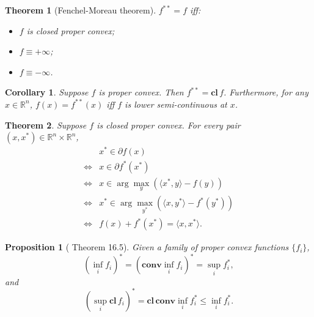 \documentclass[openany]{book}
\newtheorem{corollary}{Corollary}[chapter]
\newtheorem{proposition}{Proposition}[chapter]
\newtheorem{theorem}{Theorem}[chapter]
\theoremstyle{definition}
\theoremstyle{remark}
\begin{document}
\begin{theorem}[Fenchel-Moreau theorem]
    $f^{**}=f$ iff:
    \begin{itemize}
        \item $f$ is closed proper convex;
        \item $f\equiv+\infty$;
        \item $f\equiv-\infty$.
    \end{itemize}
\end{theorem}
\begin{corollary}\label{cor:pointBiconj}
    Suppose $f$ is proper convex. Then $f^{**}=\mathbf{cl}\,f$. Furthermore, for any $x\in \mathbb{R}^n$, $f(x)=f^{**}(x)$ iff $f$ is lower semi-continuous at $x$.
\end{corollary}
\begin{theorem}\label{convConjSubgrad}
    Suppose $f$ is closed proper convex. For every pair $(x,x^*) \in \mathbb{R}^n\times \mathbb{R}^n$,
    \begin{equation}
        \begin{array}{cl}
             & x^* \in \partial f(x) \\
            \iff & x \in \partial f^*(x^*) \\
            \iff & x \in \arg\max_{y} ( \langle x^*,y\rangle - f(y) ) \\
            \iff & x^* \in \arg\max_{y^{*}} ( \langle x,y^*\rangle - f^*(y^*) ) \\
            \iff & f(x)+f^*(x^*)=\langle x,x^*\rangle.
        \end{array}
    \end{equation}
\end{theorem}

\begin{proposition}[\cite{R15} Theorem 16.5]
    Given a family of proper convex functions $\{f_i\}$,
    \begin{equation}
        (\inf_if_i)^*=(\mathbf{conv}\inf_if_i)^*=\sup_if_i^*,
    \end{equation}
    and
    \begin{equation}
        (\sup_i \mathbf{cl}\,f_i)^*=\mathbf{cl}\,\mathbf{conv}\inf_if_i^*\le\inf_if_i^*.
    \end{equation}
\end{proposition}
\end{document}
